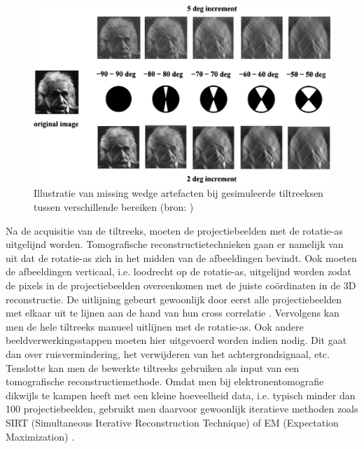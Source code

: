\documentclass{report}
\begin{document}
\begin{figure}[h!]
	\centering
	\includegraphics[width=15cm]{images/tem/missingwedge.png}
	\caption{Illustratie van missing wedge artefacten bij gesimuleerde tiltreeksen tussen verschillende bereiken (bron: \cite{fig:missingwedge})}
	\label{fig:tem_missingwedge}
\end{figure}
Na de acquisitie van de tiltreeks, moeten de projectiebeelden met de rotatie-as uitgelijnd worden. Tomografische reconstructietechnieken gaan er namelijk van uit dat de rotatie-as zich in het midden van de afbeeldingen bevindt. Ook moeten de afbeeldingen verticaal, i.e. loodrecht op de rotatie-as, uitgelijnd worden zodat de pixels in de projectiebeelden overeenkomen met de juiste coördinaten in de 3D reconstructie. De uitlijning gebeurt gewoonlijk door eerst alle projectiebeelden met elkaar uit te lijnen aan de hand van hun cross correlatie \cite{paper:tomoalign}. Vervolgens kan men de hele tiltreeks manueel uitlijnen met de rotatie-as. Ook andere beeldverwerkingsstappen moeten hier uitgevoerd worden indien nodig. Dit gaat dan over ruisvermindering, het verwijderen van het achtergrondsignaal, etc. Tenslotte kan men de bewerkte tiltreeks gebruiken als input van een tomografische reconstructiemethode. Omdat men bij elektronentomografie dikwijls te kampen heeft met een kleine hoeveelheid data, i.e. typisch minder dan 100 projectiebeelden, gebruikt men daarvoor gewoonlijk iteratieve methoden zoals SIRT (Simultaneous Iterative Reconstruction Technique) \cite{paper:sirt} of EM (Expectation Maximization) \cite{paper:em}.
\\ \\
\end{document}

